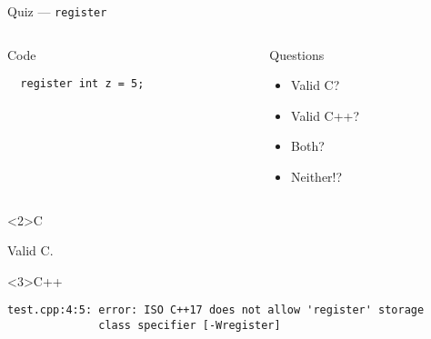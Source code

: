\documentclass[presentation,aspectratio=169]{beamer}
\begin{document}
\begin{frame}[fragile,label={sec:org23c4234}]{Quiz — \texttt{register}}
\begin{columns}
\begin{column}{0.48\columnwidth}
\begin{block}{Code}
\begin{verbatim}
  register int z = 5;
\end{verbatim}
\end{block}
\end{column}

\begin{column}{0.48\columnwidth}
\begin{block}{Questions}
\begin{itemize}
\item Valid C?
\item Valid C++?
\item Both?
\item Neither!?
\end{itemize}
\end{block}
\end{column}
\end{columns}

\begin{block}<2>{C}

Valid C.

\end{block}
\vspace{-1cm}
\begin{block}<3>{C++}
\begin{verbatim}
test.cpp:4:5: error: ISO C++17 does not allow 'register' storage
              class specifier [-Wregister]
\end{verbatim}
\end{block}
\end{frame}

\end{document}
